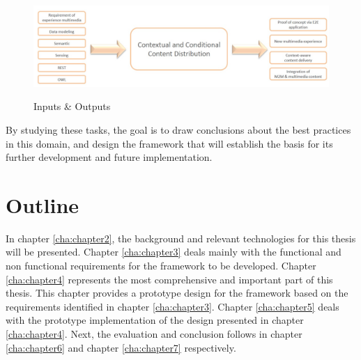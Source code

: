 \begin{figure}[htb]
  \centering
  \includegraphics[scale=0.4]{Inp_Out.jpg}\\
  \caption{Inputs \& Outputs}
  \label{fig:inout}
\end{figure}

By studying these tasks, the goal is to draw conclusions about the best practices in this domain, and design the framework that will establish the basis for its further development and future implementation.

\section{Outline\label{sec:intro_out}}
In chapter \ref{cha:chapter2}, the background and relevant technologies for this thesis will be presented. Chapter \ref{cha:chapter3} deals mainly with the functional and non functional requirements for the framework to be developed. Chapter \ref{cha:chapter4} represents the most comprehensive and important part of this thesis. This chapter provides a prototype design for the framework based on the requirements identified in chapter \ref{cha:chapter3}. Chapter \ref{cha:chapter5} deals with the prototype implementation of the design presented in chapter \ref{cha:chapter4}. Next, the evaluation and conclusion follows in chapter \ref{cha:chapter6} and chapter \ref{cha:chapter7} respectively.
